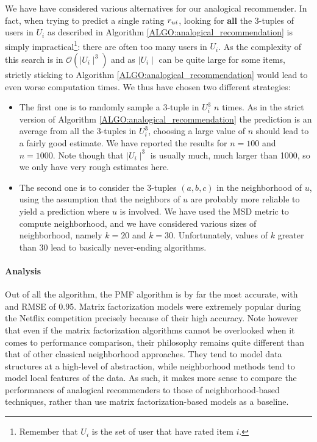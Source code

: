 We have have considered various alternatives for our analogical
recommender. In fact, when trying to predict a single rating $r_{ui}$, looking
for \textbf{all} the $3$-tuples of users in $U_i$ as described in Algorithm
\ref{ALGO:analogical_recommendation} is simply impractical\footnote{Remember
that $U_i$ is the set of user that have rated item $i$.}: there are often too
many users in $U_i$. As the complexity of this search is in $\mathcal{O}(\mid
U_i\mid^3)$ and as $\mid U_i\mid$ can be quite large for some items, strictly
sticking to Algorithm \ref{ALGO:analogical_recommendation} would lead to
even worse computation times. We thus have chosen two different strategies:
\begin{itemize}
  \item The first one is to randomly sample a $3$-tuple in $U_i^3$ $n$ times.
    As in the strict version of Algorithm \ref{ALGO:analogical_recommendation}
    the prediction is an average from all the $3$-tuples in $U_i^3$, choosing a
    large value of $n$ should lead to a fairly good estimate. We have reported
    the results for $n = 100$ and $n = 1000$. Note though that $\mid U_i
    \mid^3$ is usually much, much larger than 1000, so we only have very rough
    estimates here.
  \item The second one is to consider the $3$-tuples $(a, b, c)$ in the
    neighborhood of $u$, using the assumption that the neighbors of $u$ are
    probably more reliable to yield a prediction where $u$ is involved. We have
    used the MSD metric to compute neighborhood, and we have considered various
    sizes of neighborhood, namely $k = 20$  and $k = 30$. Unfortunately, values
    of $k$ greater than $30$ lead to basically never-ending algorithms.
\end{itemize}


\paragraph{Analysis\\}

Out of all the algorithm, the PMF algorithm is by far the most
accurate, with and RMSE of 0.95. Matrix factorization  models were extremely popular during the
Netflix competition precisely because of their high accuracy. Note however that
even if the matrix factorization algorithms cannot be overlooked when it comes
to performance comparison, their philosophy remains quite different than that
of other classical neighborhood approaches. They tend to model data structures
at a high-level of abstraction, while neighborhood methods tend to model local
features of the data. As such, it makes more sense to compare the performances
of analogical recommenders to those of neighborhood-based techniques, rather
than use matrix factorization-based models as a baseline.

